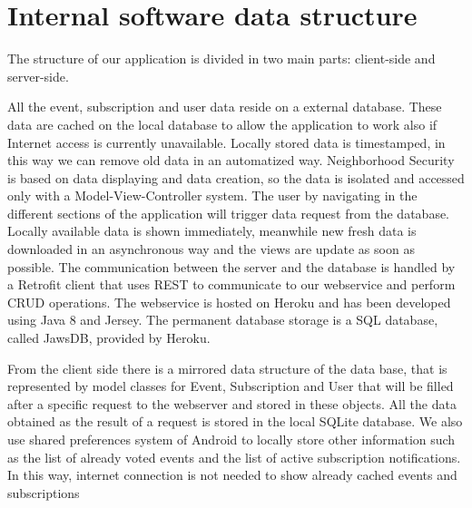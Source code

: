 \documentclass[a4paper]{scrreprt}
\begin{document}
\section{Internal software data structure}
The structure of our application is divided in two main parts: client-side and server-side.
\par All the event, subscription and user data reside on a external database. These data are cached on the local database to allow the application to work also if Internet access is currently unavailable. Locally stored data is timestamped, in this way we can remove old data in an automatized way. Neighborhood Security is based on data displaying and data creation, so the data is isolated and accessed only with a Model-View-Controller system. The user by navigating in the different sections of the application will trigger data request from the database. Locally available data is shown immediately, meanwhile new fresh data is downloaded in an asynchronous way and the views are update as soon as possible. The communication between the server and the database is handled by a Retrofit client that uses REST to communicate to our webservice and perform CRUD operations. The webservice is hosted on Heroku and has been developed using Java 8 and Jersey. The permanent database storage is a SQL database, called JawsDB, provided by Heroku.
\par From the client side there is a mirrored data structure of the data base, that is represented by model classes for Event, Subscription and User that will be filled after a specific request to the webserver and stored in these objects. All the data obtained as the result of a request is stored in the local SQLite database. We also use shared preferences system of Android to locally store other information such as the list of already voted events and the list of active subscription notifications. In this way, internet connection is not needed to show already cached events and subscriptions
\end{document}
